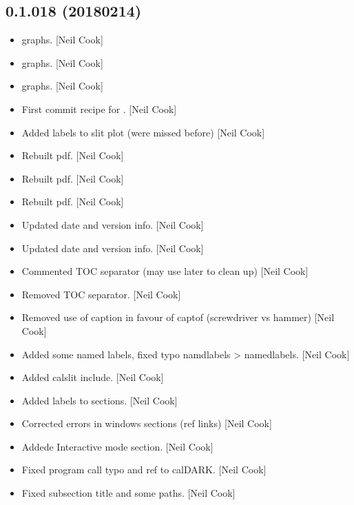 \documentclass[a4paper,10pt,english]{report}
\begin{document}
\subsection{0.1.018 (2018\sphinxhyphen{}02\sphinxhyphen{}14)}
\label{\detokenize{misc/changelog:id504}}\begin{itemize}
\item {} 
 graphs. {[}Neil Cook{]}

\item {} 
 graphs. {[}Neil Cook{]}

\item {} 
 graphs. {[}Neil Cook{]}

\item {} 
First commit \sphinxhyphen{} recipe for . {[}Neil Cook{]}

\item {} 
Added labels to slit plot (were missed before) {[}Neil Cook{]}

\item {} 
Rebuilt pdf. {[}Neil Cook{]}

\item {} 
Rebuilt pdf. {[}Neil Cook{]}

\item {} 
Rebuilt pdf. {[}Neil Cook{]}

\item {} 
Updated date and version info. {[}Neil Cook{]}

\item {} 
Updated date and version info. {[}Neil Cook{]}

\item {} 
Commented TOC separator (may use later to clean up) {[}Neil Cook{]}

\item {} 
Removed TOC separator. {[}Neil Cook{]}

\item {} 
Removed use of caption in favour of capt\sphinxhyphen{}of (screwdriver vs hammer)
{[}Neil Cook{]}

\item {} 
Added some named labels, fixed typo namdlabels \textendash{}\textgreater{} namedlabels. {[}Neil
Cook{]}

\item {} 
Added calslit include. {[}Neil Cook{]}

\item {} 
Added labels to sections. {[}Neil Cook{]}

\item {} 
Corrected errors in windows sections (ref links) {[}Neil Cook{]}

\item {} 
Addede Interactive mode section. {[}Neil Cook{]}

\item {} 
Fixed program call typo and ref to calDARK. {[}Neil Cook{]}

\item {} 
Fixed subsection title and some paths. {[}Neil Cook{]}

\end{itemize}
\end{document}
